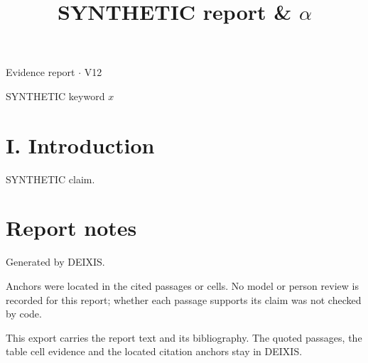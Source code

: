 \documentclass[journal]{IEEEtran}
\begin{document}
\title{SYNTHETIC report \& \ensuremath{\alpha}}

\maketitle

\noindent Evidence report \ensuremath{\cdot} V12

\begin{IEEEkeywords}

SYNTHETIC keyword $x$ \cite{Synth26}

\end{IEEEkeywords}

\section*{I. Introduction}

SYNTHETIC claim. \cite{Synth26}

\section*{Report notes}

Generated by DEIXIS.

Anchors were located in the cited passages or cells. No model or person review is recorded for this report; whether each passage supports its claim was not checked by code.

This export carries the report text and its bibliography. The quoted passages, the table cell evidence and the located citation anchors stay in DEIXIS.




\end{document}

